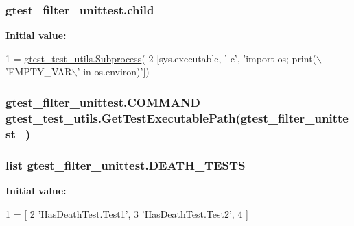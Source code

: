 \subsubsection[{\texorpdfstring{child}{child}}]{\setlength{\rightskip}{0pt plus 5cm}gtest\+\_\+filter\+\_\+unittest.\+child}\hypertarget{namespacegtest__filter__unittest_a1bb380432b61dc7972355aeb5c457c03}{}\label{namespacegtest__filter__unittest_a1bb380432b61dc7972355aeb5c457c03}
{\bfseries Initial value\+:}
\begin{DoxyCode}
1 = \hyperlink{classgtest__test__utils_1_1Subprocess}{gtest\_test\_utils.Subprocess}(
2     [sys.executable, \textcolor{stringliteral}{'-c'}, \textcolor{stringliteral}{'import os; print(\(\backslash\)'EMPTY\_VAR\(\backslash\)' in os.environ)'}])
\end{DoxyCode}
\subsubsection[{\texorpdfstring{C\+O\+M\+M\+A\+ND}{COMMAND}}]{\setlength{\rightskip}{0pt plus 5cm}gtest\+\_\+filter\+\_\+unittest.\+C\+O\+M\+M\+A\+ND = {\bf gtest\+\_\+test\+\_\+utils.\+Get\+Test\+Executable\+Path}(\textquotesingle{}gtest\+\_\+filter\+\_\+unittest\+\_\+\textquotesingle{})}\hypertarget{namespacegtest__filter__unittest_aaf600b005b9c09e727b55b60fdf8f507}{}\label{namespacegtest__filter__unittest_aaf600b005b9c09e727b55b60fdf8f507}
\subsubsection[{\texorpdfstring{D\+E\+A\+T\+H\+\_\+\+T\+E\+S\+TS}{DEATH_TESTS}}]{\setlength{\rightskip}{0pt plus 5cm}list gtest\+\_\+filter\+\_\+unittest.\+D\+E\+A\+T\+H\+\_\+\+T\+E\+S\+TS}\hypertarget{namespacegtest__filter__unittest_ab14d082dc05c07458595606a64616d0b}{}\label{namespacegtest__filter__unittest_ab14d082dc05c07458595606a64616d0b}
{\bfseries Initial value\+:}
\begin{DoxyCode}
1 = [
2     \textcolor{stringliteral}{'HasDeathTest.Test1'},
3     \textcolor{stringliteral}{'HasDeathTest.Test2'},
4     ]
\end{DoxyCode}
